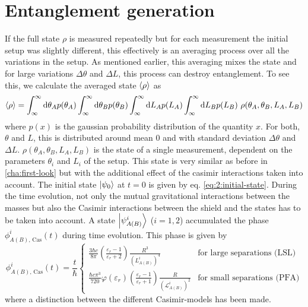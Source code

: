 \section{Entanglement generation}\label{sec:4:entanglement-generation}
If the full state $\rho$ is measured repeatedly but for each measurement the initial setup was slightly different, this effectively is an averaging process over all the variations in the setup.
As mentioned earlier, this averaging mixes the state and for large variations $\Delta \theta$ and $\Delta L$, this process can destroy entanglement.
To see this, we calculate the averaged state $\left\langle\rho\right\rangle$ as
\begin{equation}\label{eq:4:average-density}
  \left\langle\rho\right\rangle = \int_{\infty}^{\infty} \dd \theta_A p(\theta_A) \int_{\infty}^{\infty} \dd \theta_B p(\theta_B) \int_{\infty}^{\infty} \dd L_A p(L_A) \int_{\infty}^{\infty} \dd L_B p(L_B) \ \rho(\theta_A, \theta_B, L_A, L_B)
\end{equation} 
where $p(x)$ is the gaussian probability distribution of the quantity $x$. For both, $\theta$ and $L$, this is distributed around mean $0$ and with standard deviation $\Delta \theta$ and $\Delta L$. $\rho(\theta_A, \theta_B, L_A, L_B)$ is the state of a single measurement, dependent on the parameters $\theta_i$ and $L_i$ of the setup.
This state is very similar as before in \cref{cha:first-look} but with the additional effect of the casimir interactions taken into account.
The initial state $\ket{\psi_0}$ at $t=0$ is given by eq. \eqref{eq:2:initial-state}.
During the time evolution, not only the mutual gravitational interactions between the masses but also the Casimir interactions between the shield and the states has to be taken into account. A state $\ket{\psi^i_{A(B)}}$ ($i = 1, 2$) accumulated the phase $\phi^i_{A(B),\,\mathrm{Cas}}(t)$ during time evolution.
This phase is given by
\begin{equation}
  \phi^i_{A(B),\,\mathrm{Cas}}(t) = \frac{t}{\hbar}
  \begin{cases}
     \frac{3 \hbar c}{8 \pi} \left(\frac{\varepsilon_r - 1}{\varepsilon_r + 2}\right) \frac{R^3}{(L^i_{A(B)})^4} & \text{for large separations (LSL)} \\
    \frac{\hbar c \pi^3}{720} \varphi(\varepsilon_r) \left(\frac{\varepsilon_r - 1}{\varepsilon_r + 1}\right) \frac{R}{(\mathscr{L}^i_{A(B)})^2} & \text{for small separations (PFA)}
  \end{cases}
\end{equation}
where a distinction between the different Casimir-models has been made.
